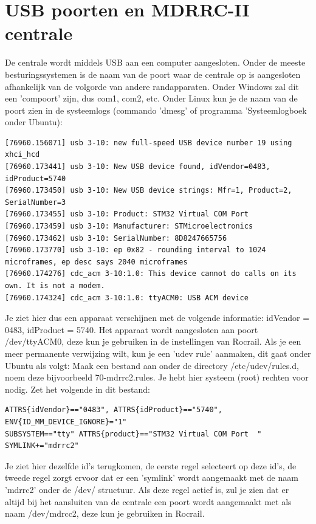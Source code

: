 \documentclass[12pt,a4paper]{report}
\newcommand*{\myfont}{\fontfamily{lmss}\normalsize\selectfont}
\newcommand*{\monofont}{\fontfamily{pcr}\scriptsize\selectfont}
\begin{document}
\chapter{USB poorten en MDRRC-II centrale}
\label{ch:usbports}
De centrale wordt middels USB aan een computer aangesloten. Onder de meeste besturingssystemen is de naam van de poort waar de centrale op is aangesloten afhankelijk van de volgorde van andere randapparaten. Onder Windows zal dit een 'compoort' zijn, dus com1, com2, etc.
Onder Linux kun je de naam van de poort zien in de systeemlogs (commando 'dmesg' of programma 'Systeemlogboek onder Ubuntu):

\monofont
\begin{verbatim}
[76960.156071] usb 3-10: new full-speed USB device number 19 using xhci_hcd 
[76960.173441] usb 3-10: New USB device found, idVendor=0483, idProduct=5740 
[76960.173450] usb 3-10: New USB device strings: Mfr=1, Product=2, SerialNumber=3 
[76960.173455] usb 3-10: Product: STM32 Virtual COM Port  
[76960.173459] usb 3-10: Manufacturer: STMicroelectronics 
[76960.173462] usb 3-10: SerialNumber: 8D8247665756 
[76960.173770] usb 3-10: ep 0x82 - rounding interval to 1024 microframes, ep desc says 2040 microframes 
[76960.174276] cdc_acm 3-10:1.0: This device cannot do calls on its own. It is not a modem. 
[76960.174324] cdc_acm 3-10:1.0: ttyACM0: USB ACM device 
\end{verbatim}
\myfont
Je ziet hier dus een apparaat verschijnen met de volgende informatie:
idVendor = 0483, idProduct = 5740.
Het apparaat wordt aangesloten aan poort /dev/ttyACM0, deze kun je gebruiken in de instellingen van Rocrail.
Als je een meer permanente verwijzing wilt, kun je een 'udev rule' aanmaken, dit gaat onder Ubuntu als volgt:
Maak een bestand aan onder de directory /etc/udev/rules.d, noem deze bijvoorbeeld 70-mdrrc2.rules. Je hebt hier systeem (root) rechten voor nodig. Zet het volgende in dit bestand:

\begin{verbatim}
ATTRS{idVendor}=="0483", ATTRS{idProduct}=="5740", ENV{ID_MM_DEVICE_IGNORE}="1" 
SUBSYSTEM=="tty" ATTRS{product}=="STM32 Virtual COM Port  " SYMLINK+="mdrrc2" 
\end{verbatim}

Je ziet hier dezelfde id's terugkomen, de eerste regel selecteert op deze id's, de tweede regel zorgt ervoor dat er een 'symlink' wordt aangemaakt met de naam 'mdrrc2' onder de /dev/ structuur.
Als deze regel actief is, zul je zien dat er altijd bij het aansluiten van de centrale een poort wordt aangemaakt met als naam /dev/mdrcc2, deze kun je gebruiken in Rocrail.
\end{document}
